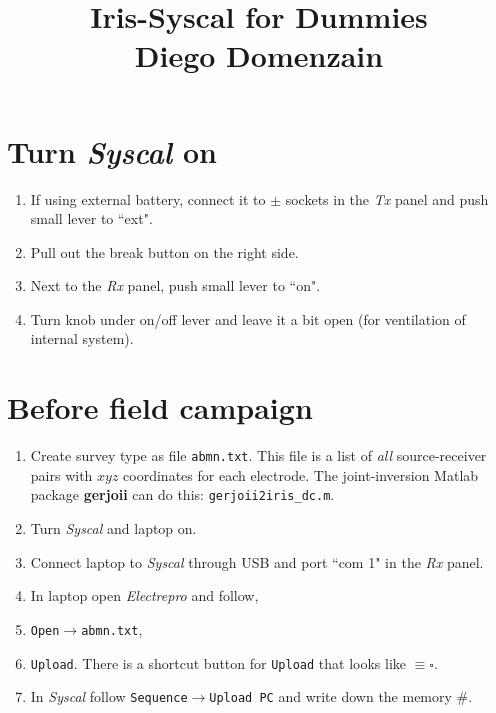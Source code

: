 \documentclass[a4paper,12pt]{article}
\title{Iris-Syscal for Dummies\\{\normalsize Diego Domenzain}}
\author{}
\date{}
\begin{document}
\maketitle
\section*{Turn {\it Syscal} on}
\begin{enumerate}
\item If using external battery, connect it to $\pm$ sockets in the {\it Tx} panel and push small lever to ``ext".
\item Pull out the break button on the right side.
\item Next to the {\it Rx} panel, push small lever to ``on".
\item Turn knob under on/off lever and leave it a bit open (for ventilation of internal system).
\end{enumerate}
\section*{Before field campaign}
\begin{enumerate}
\item Create survey type as file \texttt{abmn.txt}. This file is a list of {\it all} source-receiver pairs with $xyz$ coordinates for each electrode. The joint-inversion Matlab package {\bf gerjoii} can do this: \texttt{gerjoii2iris\_dc.m}.
\item Turn {\it Syscal} and laptop on.
\item Connect laptop to {\it Syscal} through USB and port ``com 1" in the {\it Rx} panel.
\item In laptop open {\it Electrepro} and follow,
\item \texttt{Open$\to$abmn.txt},
\item \texttt{Upload}. There is a shortcut button for \texttt{Upload} that looks like $\equiv\square$.
\item In {\it Syscal} follow \texttt{Sequence$\to$Upload PC} and write down the memory \#.
\end{enumerate}
\end{document}
